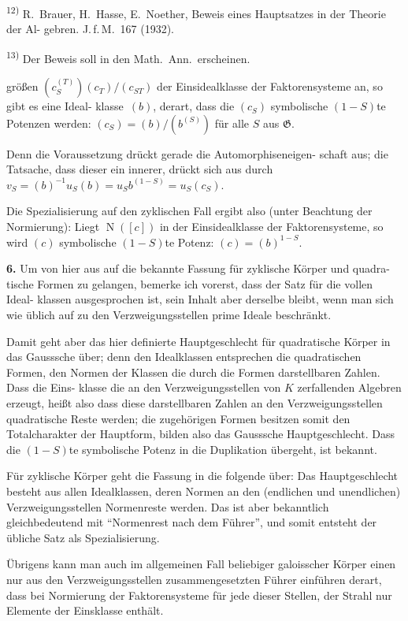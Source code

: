 \documentclass[12pt,a4paper]{article}
\theoremstyle{plain}
\newcommand{\Ga}{\mathfrak{G}}
\DeclareMathOperator{\Norm}{N}
\begin{document}
{\small
\textsuperscript{12)} R.~Brauer, H.~Hasse, E.~Noether, Beweis eines Hauptsatzes in der Theorie der Al-
gebren. J.\,f.\,M.\ 167 (1932).

\textsuperscript{13)} Der Beweis soll in den Math.\ Ann.\ erscheinen.
}


\noindent
gr\"o\ss en $(c_S^{(T)})(c_T)/(c_{ST})$ der Einsidealklasse der Faktorensysteme an, so gibt es eine Ideal-
klasse~$(b)$, derart, dass die $(c_S)$ symbolische $(1-S)$te Potenzen werden:
$(c_S) = (b)/(b^{(S)})$ f\"ur alle $S$ aus $\Ga$.

Denn die Voraussetzung dr\"uckt gerade die Automorphiseneigen-
schaft aus; die Tatsache, dass dieser ein innerer, dr\"uckt sich aus durch
$v_S = (b)^{-1} u_S (b) = u_S b^{(1-S)} = u_S (c_S)$.

Die Spezialisierung auf den zyklischen Fall ergibt also (unter Beachtung der
Normierung): Liegt $\Norm([c])$ in der Einsidealklasse der Faktorensysteme, so wird $(c)$
symbolische $(1-S)$te Potenz: $(c) = (b)^{1-S}$.

\smallskip
\noindent\textbf{6.}\hspace{0.5em}%
Um von hier aus auf die bekannte Fassung f\"ur zyklische K\"orper und quadra-
tische Formen zu gelangen, bemerke ich vorerst, dass der Satz f\"ur die vollen Ideal-
klassen ausgesprochen ist, sein Inhalt aber derselbe bleibt, wenn man sich wie \"ublich
auf zu den Verzweigungsstellen prime Ideale beschr\"ankt.

Damit geht aber das hier definierte Hauptgeschlecht f\"ur quadratische K\"orper in
das Gausssche \"uber; denn den Idealklassen entsprechen die quadratischen Formen,
den Normen der Klassen die durch die Formen darstellbaren Zahlen. Dass die Eins-
klasse die an den Verzweigungsstellen von $K$ zerfallenden Algebren erzeugt, hei\ss t
also dass diese darstellbaren Zahlen an den Verzweigungsstellen quadratische Reste
werden; die zugeh\"origen Formen besitzen somit den Totalcharakter der Hauptform,
bilden also das Gausssche Hauptgeschlecht. Dass die $(1-S)$te symbolische Potenz in
die Duplikation \"ubergeht, ist bekannt.

F\"ur zyklische K\"orper geht die Fassung in die folgende \"uber: Das Hauptgeschlecht
besteht aus allen Idealklassen, deren Normen an den (endlichen und unendlichen)
Verzweigungsstellen Normenreste werden. Das ist aber bekanntlich gleichbedeutend
mit ``Normenrest nach dem F\"uhrer'', und somit entsteht der \"ubliche Satz als
Spezialisierung.

\"Ubrigens kann man auch im allgemeinen Fall beliebiger galoisscher K\"orper einen
nur aus den Verzweigungsstellen zusammengesetzten F\"uhrer einf\"uhren derart, dass
bei Normierung der Faktorensysteme f\"ur jede dieser Stellen, der Strahl nur Elemente
der Einsklasse enth\"alt.
\end{document}
